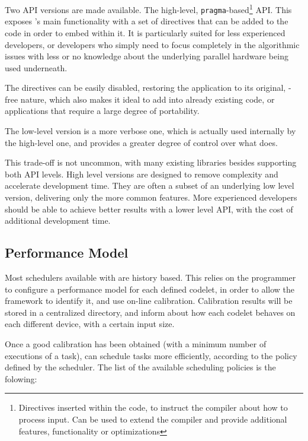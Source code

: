 \documentclass[main.tex]{subfiles}
\begin{document}
Two API versions are made available. The high-level, \texttt{pragma}-based\footnote{Directives inserted within the code, to instruct the compiler about how to process input. Can be used to extend the compiler and provide additional features, functionality or optimizations} API. This exposes \starpu's main functionality with a set of directives that can be added to the code in order to embed \starpu within it. It is particularly suited for less experienced developers, or developers who simply need to focus completely in the algorithmic issues with less or no knowledge about the underlying parallel hardware being used underneath.

The directives can be easily disabled, restoring the application to its original, \starpu-free nature, which also makes it ideal to add \starpu into already existing code, or applications that require a large degree of portability.

The low-level version is a more verbose one, which is actually used internally by the high-level one, and provides a greater degree of control over what \starpu does.

This trade-off is not uncommon, with many existing libraries besides \starpu supporting both API levels. High level versions are designed to remove complexity and accelerate development time. They are often a subset of an underlying low level version, delivering only the more common features. More experienced developers should be able to achieve better results with a lower level API, with the cost of additional development time.

\subsection{Performance Model}

Most schedulers available with \starpu are history based. This relies on the programmer to configure a performance model for each defined codelet, in order to allow the framework to identify it, and use on-line calibration. Calibration results will be stored in a centralized directory, and inform \starpu about how each codelet behaves on each different device, with a certain input size.

Once a good calibration has been obtained (with a minimum number of executions of a task), \starpu can schedule tasks more efficiently, according to the policy defined by the scheduler. The list of the available scheduling policies is the folowing:
\end{document}
